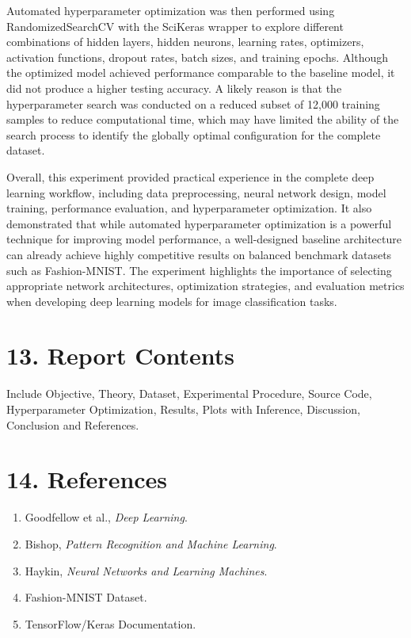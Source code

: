 \documentclass[11pt]{article}
\begin{document}
Automated hyperparameter optimization was then performed using RandomizedSearchCV with the SciKeras wrapper to explore different combinations of hidden layers, hidden neurons, learning rates, optimizers, activation functions, dropout rates, batch sizes, and training epochs. Although the optimized model achieved performance comparable to the baseline model, it did not produce a higher testing accuracy. A likely reason is that the hyperparameter search was conducted on a reduced subset of 12,000 training samples to reduce computational time, which may have limited the ability of the search process to identify the globally optimal configuration for the complete dataset.

Overall, this experiment provided practical experience in the complete deep learning workflow, including data preprocessing, neural network design, model training, performance evaluation, and hyperparameter optimization. It also demonstrated that while automated hyperparameter optimization is a powerful technique for improving model performance, a well-designed baseline architecture can already achieve highly competitive results on balanced benchmark datasets such as Fashion-MNIST. The experiment highlights the importance of selecting appropriate network architectures, optimization strategies, and evaluation metrics when developing deep learning models for image classification tasks.


\section*{13. Report Contents}

Include Objective, Theory, Dataset, Experimental Procedure, Source Code, Hyperparameter Optimization, Results, Plots with Inference, Discussion, Conclusion and References.

\section*{14. References}
\begin{enumerate}
\item Goodfellow et al., \emph{Deep Learning}.
\item Bishop, \emph{Pattern Recognition and Machine Learning}.
\item Haykin, \emph{Neural Networks and Learning Machines}.
\item Fashion-MNIST Dataset.
\item TensorFlow/Keras Documentation.
\end{enumerate}
\end{document}
